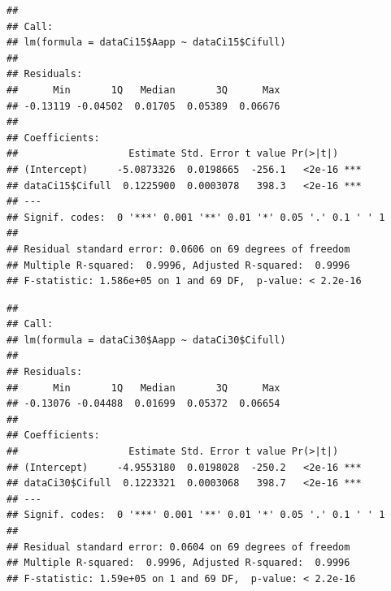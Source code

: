 \documentclass[
]{krantz}
\makeatletter
\newenvironment{Shaded}{\begin{snugshade}}{\end{snugshade}}
\newcommand{\DecValTok}[1]{\textcolor[rgb]{0.00,0.00,0.81}{#1}}
\newcommand{\FunctionTok}[1]{\textcolor[rgb]{0.00,0.00,0.00}{#1}}
\newcommand{\NormalTok}[1]{#1}
\newcommand{\OtherTok}[1]{\textcolor[rgb]{0.56,0.35,0.01}{#1}}
\newcommand{\SpecialCharTok}[1]{\textcolor[rgb]{0.00,0.00,0.00}{#1}}
\newenvironment{kframe}{%
\medskip{}
\setlength{\fboxsep}{.8em}
 \def\at@end@of@kframe{}%
 \ifinner\ifhmode%
  \def\at@end@of@kframe{\end{minipage}}%
  \begin{minipage}{\columnwidth}%
 \fi\fi%
 \def\FrameCommand##1{\hskip\@totalleftmargin \hskip-\fboxsep
 \colorbox{shadecolor}{##1}\hskip-\fboxsep
     \hskip-\linewidth \hskip-\@totalleftmargin \hskip\columnwidth}%
 \MakeFramed {\advance\hsize-\width
   \@totalleftmargin\z@ \linewidth\hsize
   \@setminipage}}%
 {\par\unskip\endMakeFramed%
 \at@end@of@kframe}
\renewenvironment{Shaded}{\begin{kframe}}{\end{kframe}}
\makeatother
\begin{document}
\begin{Shaded}
\end{Shaded}

\begin{verbatim}
## 
## Call:
## lm(formula = dataCi15$Aapp ~ dataCi15$Cifull)
## 
## Residuals:
##      Min       1Q   Median       3Q      Max 
## -0.13119 -0.04502  0.01705  0.05389  0.06676 
## 
## Coefficients:
##                   Estimate Std. Error t value Pr(>|t|)    
## (Intercept)     -5.0873326  0.0198665  -256.1   <2e-16 ***
## dataCi15$Cifull  0.1225900  0.0003078   398.3   <2e-16 ***
## ---
## Signif. codes:  0 '***' 0.001 '**' 0.01 '*' 0.05 '.' 0.1 ' ' 1
## 
## Residual standard error: 0.0606 on 69 degrees of freedom
## Multiple R-squared:  0.9996, Adjusted R-squared:  0.9996 
## F-statistic: 1.586e+05 on 1 and 69 DF,  p-value: < 2.2e-16
\end{verbatim}

\begin{Shaded}
\end{Shaded}

\begin{verbatim}
## 
## Call:
## lm(formula = dataCi30$Aapp ~ dataCi30$Cifull)
## 
## Residuals:
##      Min       1Q   Median       3Q      Max 
## -0.13076 -0.04488  0.01699  0.05372  0.06654 
## 
## Coefficients:
##                   Estimate Std. Error t value Pr(>|t|)    
## (Intercept)     -4.9553180  0.0198028  -250.2   <2e-16 ***
## dataCi30$Cifull  0.1223321  0.0003068   398.7   <2e-16 ***
## ---
## Signif. codes:  0 '***' 0.001 '**' 0.01 '*' 0.05 '.' 0.1 ' ' 1
## 
## Residual standard error: 0.0604 on 69 degrees of freedom
## Multiple R-squared:  0.9996, Adjusted R-squared:  0.9996 
## F-statistic: 1.59e+05 on 1 and 69 DF,  p-value: < 2.2e-16
\end{verbatim}
\end{document}
